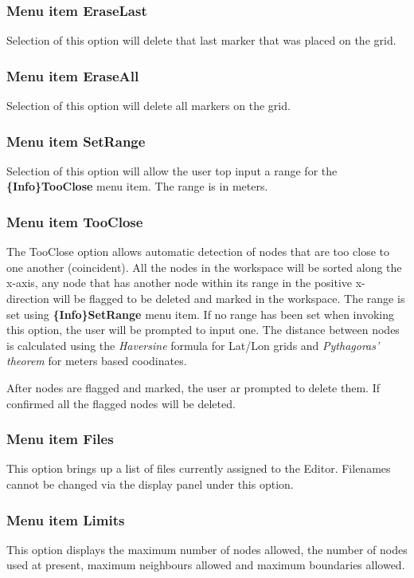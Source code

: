 \documentclass{article}
\begin{document}
\subsubsection{Menu item EraseLast}
Selection of this option will delete that last marker that was placed on the grid.

\subsubsection{Menu item EraseAll}
Selection of this option will delete all markers on the grid.

\subsubsection[Menu item SetRange]{Menu item SetRange}
Selection of this option will allow the user top input a range for the \textbf{\{Info\}TooClose} menu item. The range is in meters.

\subsubsection[Menu item TooClose]{Menu item TooClose}

The TooClose option allows automatic detection of nodes that are too close to one another (coincident). All the nodes in the workspace will be sorted along the x-axis, any node that has another node within its range in the positive x-direction will be flagged to be deleted and marked in the workspace. The range is set using \textbf{\{Info\}SetRange} menu item. If no range has been set when invoking this option, the user will be prompted to input one. The distance between nodes is calculated using the \emph{Haversine} formula for Lat/Lon grids and \emph{Pythagoras' theorem} for meters based coodinates.

After nodes are flagged and marked, the user ar prompted to delete them. If confirmed all the flagged nodes will be deleted.

\subsubsection[Menu item Files]{Menu item Files}
This option brings up a list of files currently assigned to the Editor. Filenames cannot be changed via the display panel under this option.

\subsubsection[Menu item Limits]{Menu item Limits}
This option displays the maximum number of nodes allowed, the number of nodes used at present, maximum neighbours allowed and maximum boundaries allowed.
\end{document}
